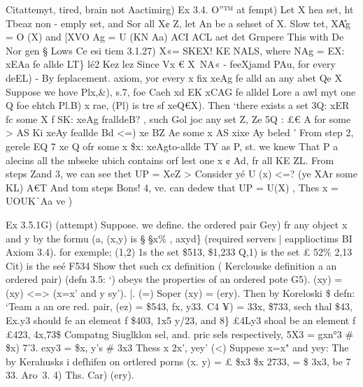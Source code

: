 \documentclass[a4paper,12pt]{article}
\begin{document}
    Citattemyt, tired, brain not Aactimirg)  Ex 3.4. O”™ at fempt)  Let X hea set, ht Tbeaz non - emply set, and Sor all X¢ Z,  let An be a sehset of X.         Slow tet, X\U Ag = O (X\Ax) and [XVO Ag = U (KN Aa)  ACI ACL aet det              Grnpere This with De Nor gen § Lows Ce esi tiem 3.1.27)  X\OAg «= SKEX! KE NALS, where NAg = EX: xEAa fe allde LT\}  lé2 Kez lez  Since Vx € X\ NA« - feeXjamd PAu, for every deEL)  - By feplacement. axiom, yor every x fix xeAg fe alld an any abet Qe X  Suppose we hove Plx,\&), s.7, foe Caeh xd EK xCAG fe alldel Lore a awl myt  one Q foe ehtch Pl.B) x rae, (Pl) is tre sf xeQ€X).  Then ‘there exists a set 3Q: xER fc some X f SK: xeAg fralldeB? , such Gol  joc any set Z,  Ze 5Q : £€ A for some > AS Ki xeAy feallde Bd    <=) xe BZ Ae some x AS xixe Ay beled    ’ From step 2, gerele EQ 7 xe Q ofr some x \$x: xeAgto-allde TY as P, st.  we knew That P a alecins all the mbseke ubich contains orf lest one x ¢ Ad, fr all KE ZL.    From steps Zand 3, we can see thet UP = X\NAg  eZ  > Consider yé U (x\Aa) <=? (ye X\An Ar some KL)  A€T    And tom steps Bons! 4, ve. can dedew that UP = U(X\Ax) , Thes  x = UOUK\A  \f\ Aa ve \Ax) 

\vspace{10pt}

\par

\vspace{10pt}

    Ex 3.5.1G) (attempt)  Suppose. we define. the ordered pair Gey) fr any object x and y  by the formu (a, (x,y) is § §x\% , axyd\} (required servers | eapplioctims BI Axiom 3.4).  for exemple; (1,2) 1s the set \$513, \$1,233  Q,1) is the set £ 52\% 2,13  Cit) is the seé F534    Show thet such cx definition ( Kerclouske definition a an ordered pair) (defn 3.5: ‘)  obeys the properties of an ordered pote G5). (xy) = (xy) <=> (x=x' and y sy’).  |. (=) Soper (xy) = (ery).  Then by Koreloski \$ defn: ‘Team a an ore red. pair,  (ez) = \$543, fx, y33.  C4 ¥) = 33x, \$733,  sech thal \$43, Ex.y3 should fe an elemeat f \$403, 1x5 y/23, and  8\} £4Ly3 shoal be an element f £423, 4x,73\$    Compatng Siuglklon sel, and. pric sels respectively, 5X3 = gxn°3 \# \$x) 7'3.  exy3 = \$x, y's \# 3x3  Thess x 2x’, yey’    (<) Suppese x=x" and yey:  The by Kerahusks i defhifen on ortlered porns (x. y) = £ \$x3 \$x 2733,  = \$ 3x3, be 7 33. Aro~3. 4)  Ths. Car) (ery). 

\vspace{10pt}

\par
\end{document}
